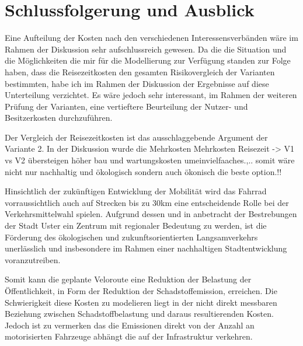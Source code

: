 %
%
%
%

\chapter{Schlussfolgerung und Ausblick}
\label{chap:Schlussfolgerung}




Eine Aufteilung der Kosten nach den verschiedenen Interessensverbänden wäre im Rahmen der Diskussion sehr aufschlussreich gewesen. Da die die Situation und die Möglichkeiten die mir für die Modellierung zur Verfügung standen zur Folge haben, dass die Reisezeitkosten den gesamten Risikovergleich der Varianten bestimmten, habe ich im Rahmen der Diskussion der Ergebnisse auf diese Unterteilung verzichtet. Es wäre jedoch sehr interessant, im Rahmen der weiteren Prüfung der Varianten, eine vertieftere Beurteilung der Nutzer- und Besitzerkosten durchzuführen.

Der Vergleich der Reisezeitkosten ist das ausschlaggebende Argument der Variante 2. In der Diskussion wurde die Mehrkosten
Mehrkosten Reisezeit -> V1 vs V2 übersteigen höher bau und wartungskosten umeinvielfaaches.,.. somit wäre nicht nur nachhaltig und ökologisch sondern auch ökonisch die beste option.!! 


Hinsichtlich der zukünftigen Entwicklung der Mobilität wird das Fahrrad vorraussichtlich auch auf Strecken bis zu 30km eine entscheidende Rolle bei der Verkehrsmittelwahl spielen. Aufgrund dessen und in anbetracht der Bestrebungen der Stadt Uster ein Zentrum mit regionaler Bedeutung zu werden, ist die Förderung des ökologischen und zukunftsorientierten Langsamverkehrs unerlässlich und insbesondere im Rahmen einer nachhaltigen Stadtentwicklung voranzutreiben.

Somit kann die geplante Veloroute eine Reduktion der Belastung der Öffentlichkeit, in Form der Reduktion der Schadstoffemission, erreichen. 	
Die Schwierigkeit diese Kosten zu modelieren liegt in der nicht direkt messbaren Beziehung zwischen Schadstoffbelastung und daraus resultierenden Kosten. Jedoch ist zu vermerken das die Emissionen direkt von der Anzahl an motorisierten Fahrzeuge abhängt die auf der Infrastruktur verkehren.

